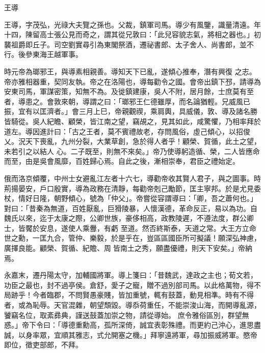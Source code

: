 
\begin{pinyinscope}
王導



 王導，字茂弘，光祿大夫覽之孫也。父裁，鎮軍司馬。導少有風鑒，識量清遠。年十四，陳留高士張公見而奇之，謂其從兄敦曰：「此兒容貌志氣，將相之器也。」初襲祖爵即丘子。司空劉實尋引為東閣祭酒，遷祕書郎、太子舍人、尚書郎，並不行。後參東海王越軍事。



 時元帝為瑯邪王，與導素相親善。導知天下已亂，遂傾心推奉，潛有興復
 之志。帝亦雅相器重，契同友執。帝之在洛陽也，導每勸令之國。會帝出鎮下邳，請導為安東司馬，軍謀密策，知無不為。及徙鎮建康，吳人不附，居月餘，士庶莫有至者，導患之。會敦來朝，導謂之曰：「瑯邪王仁德雖厚，而名論猶輕。兄威風已振，宜有以匡濟者。」會三月上巳，帝親觀禊，乘肩輿，具威儀，敦、導及諸名勝皆騎從。吳人紀瞻、顧榮，皆江南之望，竊覘之，見其如此，咸驚懼，乃相率拜於道左。導因進計曰：「古之王者，莫不賓禮故老，存問風俗，虛己傾心，以招俊乂。況天下喪亂，九州分裂，大業草創，急於得人者乎！顧榮、賀循，此土之望，未若引之以結人
 心。二子既至，則無不來矣。」帝乃使導躬造循、榮，二人皆應命而至，由是吳會風靡，百姓歸心焉。自此之後，漸相崇奉，君臣之禮始定。



 俄而洛京傾覆，中州士女避亂江左者十六七，導勸帝收其賢人君子，與之圖事。時荊揚晏安，戶口殷實，導為政務在清靜，每勸帝剋己勵節，匡主寧邦。於是尤見委杖，情好日隆，朝野傾心，號為「仲父」。帝嘗從容謂導曰：「卿，吾之蕭何也。」對曰：「昔秦為無道，百姓厭亂，巨猾陵暴，人懷漢德，革命反正，易以為功。自魏氏以來，迄于太康之際，公卿世族，豪侈相高，政教陵遲，不遵法度，群公卿士，皆饜於安息，遂使人乘釁，有虧
 至道。然否終斯泰，天道之常。大王方立命世之勳，一匡九合，管仲、樂毅，於是乎在，豈區區國臣所可擬議！願深弘神慮，廣擇良能。顧榮、賀循、紀贍、周皆南土之秀，願盡優禮，則天下安矣。」帝納焉。



 永嘉末，遷丹陽太守，加輔國將軍。導上箋曰：「昔魏武，達政之主也；荀文若，功臣之最也，封不過亭侯。倉舒，愛子之寵，贈不過別部司馬。以此格萬物，得不局跡乎！今者臨郡，不問賢愚豪賤，皆加重號，輒有鼓蓋，動見相準。時有不得者，或為恥辱。天官混雜，朝望頹毀。導忝荷重任，不能崇浚山海，而開導亂源，饕竊名位，取紊彞典，謹送鼓蓋加崇之物，請從導始。
 庶令雅俗區別，群望無惑。」帝下令曰：「導德重勳高，孤所深倚，誠宜表彰殊禮。而更約己沖心，進思盡誠，以身率眾，宜順其雅志，式允開塞之機。」拜寧遠將軍，尋加振威將軍。愍帝即位，徵吏部郎，不拜。




\end{pinyinscope}
